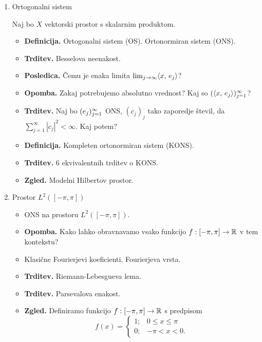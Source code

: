 \begin{enumerate}
    \item Ortogonalni sistem
    
    Naj bo \(X\) vektorski prostor s skalarnim produktom.
    \begin{itemize}
        \item \textbf{Definicija.} Ortogonalni sistem (OS). Ortonormiran sistem (ONS).
        \item \textbf{Trditev.} Besselova neenakost. \todo{*}
        \item \textbf{Posledica.} Čemu je enaka limita \(\lim_{j \to \infty} \langle x, \, e_j \rangle\)?
        \item \textbf{Opomba.} Zakaj potrebujemo absolutno vrednost? Kaj so \((\langle x, \, e_j \rangle)_{j=1}^\infty\)?
        \item \textbf{Trditev.} Naj bo \((e_j)_{j=1}^\infty\) ONS, \((c_j)_j\) tako zaporedje števil, da \(\sum_{j=1}^{\infty} |c_j|^2 < \infty\). Kaj potem?
        \item \textbf{Definicija.} Kompleten ortonormiran sistem (KONS).
        \item \textbf{Trditev.} 6 ekvivalentnih trditev o KONS. \todo{*}
        \item \textbf{Zgled.} Modelni Hilbertov prostor.  
    \end{itemize}

    \item Prostor \(L^2([-\pi, \pi])\)
    \begin{itemize}
        \item ONS na prostoru \(L^2([-\pi, \pi])\). 
        \item \textbf{Opomba.} Kako lahko obravnavamo vsako funkcijo \(f: [-\pi, \pi] \to \mathbb{R}\) v tem kontekstu?
        \item Klasične Fourierjevi koeficienti. Fourierjeva vrsta. \todo{*}
        \item \textbf{Trditev.} Riemann-Lebesgueva lema.
        \item \textbf{Trditev.} Parsevalova enakost.
        \item \textbf{Zgled.} Definiramo funkcijo \(f: [-\pi, \pi] \to \mathbb{R}\) s predpisom
        \[
            f(x) = \begin{cases}
                1; &0 \leq x \leq \pi \\
                0; &-\pi < x < 0.
            \end{cases}
        \]
        

\end{itemize}
\end{enumerate}
